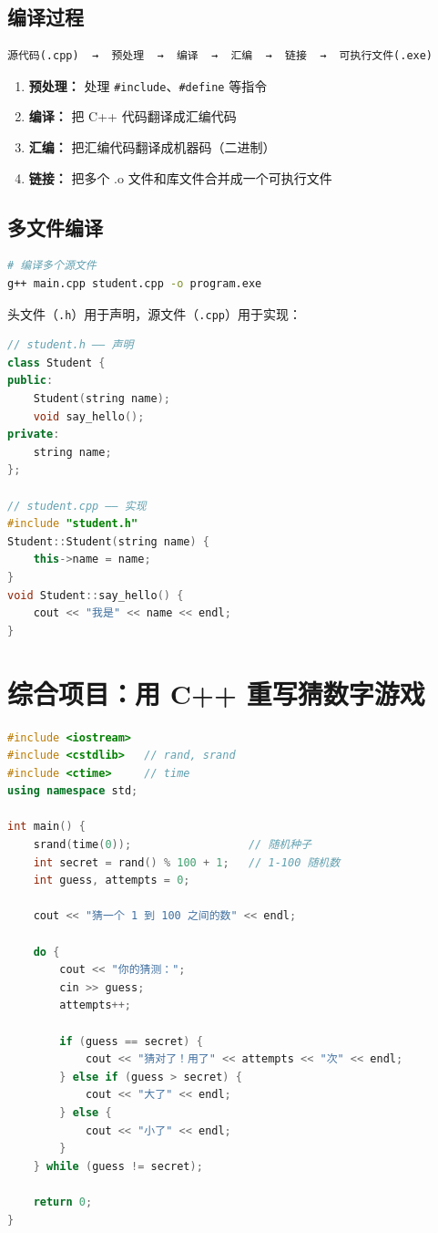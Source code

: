\documentclass[a4paper,12pt]{ctexart}
\begin{document}
\subsection*{编译过程}

\begin{verbatim}
源代码(.cpp)  →  预处理  →  编译  →  汇编  →  链接  →  可执行文件(.exe)
\end{verbatim}

\begin{enumerate}
  \item \textbf{预处理：} 处理 \texttt{\#include}、\texttt{\#define} 等指令
  \item \textbf{编译：} 把 C++ 代码翻译成汇编代码
  \item \textbf{汇编：} 把汇编代码翻译成机器码（二进制）
  \item \textbf{链接：} 把多个 .o 文件和库文件合并成一个可执行文件
\end{enumerate}

\subsection*{多文件编译}

\begin{lstlisting}[language=bash]
# 编译多个源文件
g++ main.cpp student.cpp -o program.exe
\end{lstlisting}

头文件（\texttt{.h}）用于声明，源文件（\texttt{.cpp}）用于实现：

\begin{lstlisting}[language=C++]
// student.h —— 声明
class Student {
public:
    Student(string name);
    void say_hello();
private:
    string name;
};

// student.cpp —— 实现
#include "student.h"
Student::Student(string name) {
    this->name = name;
}
void Student::say_hello() {
    cout << "我是" << name << endl;
}
\end{lstlisting}

\section*{综合项目：用 C++ 重写猜数字游戏}

\begin{lstlisting}[language=C++]
#include <iostream>
#include <cstdlib>   // rand, srand
#include <ctime>     // time
using namespace std;

int main() {
    srand(time(0));                  // 随机种子
    int secret = rand() % 100 + 1;   // 1-100 随机数
    int guess, attempts = 0;
    
    cout << "猜一个 1 到 100 之间的数" << endl;
    
    do {
        cout << "你的猜测：";
        cin >> guess;
        attempts++;
        
        if (guess == secret) {
            cout << "猜对了！用了" << attempts << "次" << endl;
        } else if (guess > secret) {
            cout << "大了" << endl;
        } else {
            cout << "小了" << endl;
        }
    } while (guess != secret);
    
    return 0;
}
\end{lstlisting}
\end{document}
